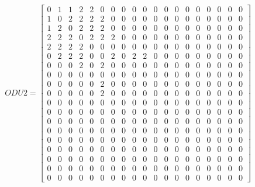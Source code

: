 \[
ODU2=
  \begin{bmatrix}
    0 & 1 & 1 & 2 & 2 & 0 & 0 & 0 & 0 & 0 & 0 & 0 & 0 & 0 & 0 & 0 & 0 & 0 & 0 \\
    1 & 0 & 2 & 2 & 2 & 2 & 0 & 0 & 0 & 0 & 0 & 0 & 0 & 0 & 0 & 0 & 0 & 0 & 0 \\
    1 & 2 & 0 & 2 & 2 & 2 & 0 & 0 & 0 & 0 & 0 & 0 & 0 & 0 & 0 & 0 & 0 & 0 & 0 \\
    2 & 2 & 2 & 0 & 2 & 2 & 2 & 0 & 0 & 0 & 0 & 0 & 0 & 0 & 0 & 0 & 0 & 0 & 0 \\
    2 & 2 & 2 & 2 & 0 & 0 & 0 & 0 & 0 & 0 & 0 & 0 & 0 & 0 & 0 & 0 & 0 & 0 & 0 \\
    0 & 2 & 2 & 2 & 0 & 0 & 2 & 0 & 2 & 2 & 0 & 0 & 0 & 0 & 0 & 0 & 0 & 0 & 0 \\
    0 & 0 & 0 & 2 & 0 & 2 & 0 & 0 & 0 & 0 & 0 & 0 & 0 & 0 & 0 & 0 & 0 & 0 & 0 \\
    0 & 0 & 0 & 0 & 0 & 0 & 0 & 0 & 0 & 0 & 0 & 0 & 0 & 0 & 0 & 0 & 0 & 0 & 0 \\
    0 & 0 & 0 & 0 & 0 & 2 & 0 & 0 & 0 & 0 & 0 & 0 & 0 & 0 & 0 & 0 & 0 & 0 & 0 \\
    0 & 0 & 0 & 0 & 0 & 2 & 0 & 0 & 0 & 0 & 0 & 0 & 0 & 0 & 0 & 0 & 0 & 0 & 0 \\
    0 & 0 & 0 & 0 & 0 & 0 & 0 & 0 & 0 & 0 & 0 & 0 & 0 & 0 & 0 & 0 & 0 & 0 & 0 \\
    0 & 0 & 0 & 0 & 0 & 0 & 0 & 0 & 0 & 0 & 0 & 0 & 0 & 0 & 0 & 0 & 0 & 0 & 0 \\
    0 & 0 & 0 & 0 & 0 & 0 & 0 & 0 & 0 & 0 & 0 & 0 & 0 & 0 & 0 & 0 & 0 & 0 & 0 \\
    0 & 0 & 0 & 0 & 0 & 0 & 0 & 0 & 0 & 0 & 0 & 0 & 0 & 0 & 0 & 0 & 0 & 0 & 0 \\
    0 & 0 & 0 & 0 & 0 & 0 & 0 & 0 & 0 & 0 & 0 & 0 & 0 & 0 & 0 & 0 & 0 & 0 & 0 \\
    0 & 0 & 0 & 0 & 0 & 0 & 0 & 0 & 0 & 0 & 0 & 0 & 0 & 0 & 0 & 0 & 0 & 0 & 0 \\
    0 & 0 & 0 & 0 & 0 & 0 & 0 & 0 & 0 & 0 & 0 & 0 & 0 & 0 & 0 & 0 & 0 & 0 & 0 \\
    0 & 0 & 0 & 0 & 0 & 0 & 0 & 0 & 0 & 0 & 0 & 0 & 0 & 0 & 0 & 0 & 0 & 0 & 0 \\
    0 & 0 & 0 & 0 & 0 & 0 & 0 & 0 & 0 & 0 & 0 & 0 & 0 & 0 & 0 & 0 & 0 & 0 & 0
  \end{bmatrix}
\]

\vspace{15pt}

